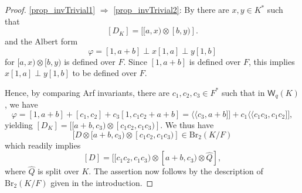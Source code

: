 \documentclass{amsart}
\numberwithin{equation}{section}
\newcommand{\qpf}[1]{\langle\!\langle #1]\!]}
\newcommand{\BrTwo}{\mathrm{Br}_2}
\newcommand{\quat}[1]{[#1)}
\newcommand{\W}{\mathsf{W}}
\begin{document}
\begin{proof}
    \ref{prop_invTrivial1} $\Rightarrow$ \ref{prop_invTrivial2}:
        By  there are $x, y \in K^\ast$ such that 
        \[[D_K] = [\quat{a, x} \otimes \quat{b, y}].\]
        and the Albert form
        \[\varphi = [1, a + b] \perp x [1, a] \perp y[1, b]\]
        for $\quat{a, x} \otimes \quat{b, y}$ is defined over $F$.
        Since $[1, a + b]$ is defined over $F$, this implies $x [1, a] \perp y[1, b]$ to be defined over $F$.
    
        Hence, by comparing Arf invariants, there are $c_1, c_2, c_3 \in F^\ast$ such that in $\W_q(K)$, we have
        \[{\varphi} = [1, a+b] + [c_1, c_2] + c_3[1, c_1c_2 + a + b] = \qpf{c_3, a+b} + c_1 \qpf{c_1c_3, c_1c_2},\]
        yielding $[D_K] = [\quat{a+b, c_3} \otimes \quat{c_1c_2, c_1c_3}]$.
        We thus have 
        \[[D \otimes \quat{a+b, c_3} \otimes \quat{c_1c_2, c_1c_3}] \in \BrTwo(K/F)\]
        which readily implies
        \[[D] = [\quat{c_1c_2, c_1c_3} \otimes \quat{a+b, c_3} \otimes \widehat Q],\]
        where $\widehat Q$ is split over $K$.
        The assertion now follows by the description of $\BrTwo(K/F)$ given in the introduction.


\end{proof}
\end{document}
